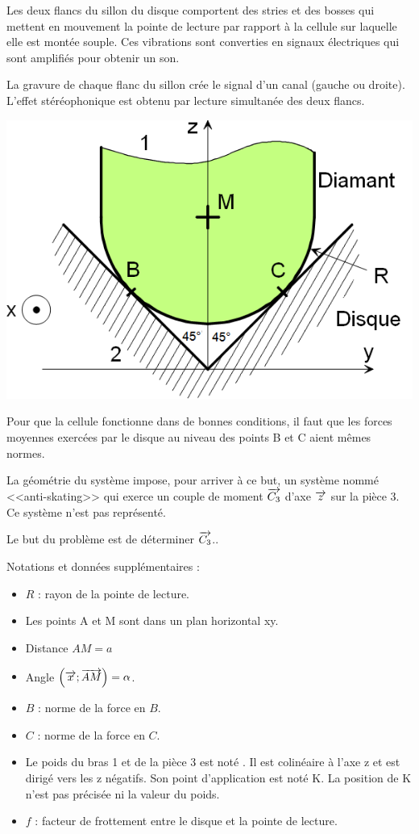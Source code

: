 \documentclass[10pt,fleqn]{article} %
\begin{document}
\begin{multicols}{2}
Les deux flancs du sillon du disque comportent des stries et des bosses qui mettent en mouvement la pointe de lecture par rapport à la cellule sur laquelle elle est montée souple. Ces vibrations sont converties en signaux électriques qui sont amplifiés pour obtenir un son.

La gravure de chaque flanc du sillon crée le signal d'un canal (gauche ou droite). L'effet stéréophonique est obtenu par lecture simultanée des deux flancs.

\begin{center}
\includegraphics[width=.95\linewidth]{images/fig5}
\end{center}


Pour que la cellule fonctionne dans de bonnes conditions, il faut que les forces moyennes exercées par le disque au niveau des points B et C aient mêmes normes.

La géométrie du système impose, pour arriver à ce but, un système nommé <<anti-skating>> qui exerce un couple de moment  $\overrightarrow{C_3}$ d'axe $\overrightarrow{z}$ sur la pièce 3. Ce système n'est pas représenté.  

\begin{obj}
Le but du problème est de déterminer $\overrightarrow{C_3}$..
\end{obj}


Notations et données supplémentaires : 
\begin{itemize}
\item $R$ : rayon de la pointe de lecture.
\item Les points A et M sont dans un plan horizontal xy.
\item Distance $AM = a$
\item Angle $\left(\overrightarrow{x};\overrightarrow{AM} \right)= \alpha$.
\item $B$ : norme de la force en $B$.
\item $C$ : norme de la force en $C$.
\item Le poids du bras 1 et de la pièce 3 est noté  . Il est colinéaire à l'axe z et est dirigé vers les z négatifs. Son point d'application est noté K. La position de K n'est pas précisée ni la valeur du poids.
\item $f$ : facteur de frottement entre le disque et la pointe de lecture.
\end{itemize}


\end{multicols}
\end{document}
